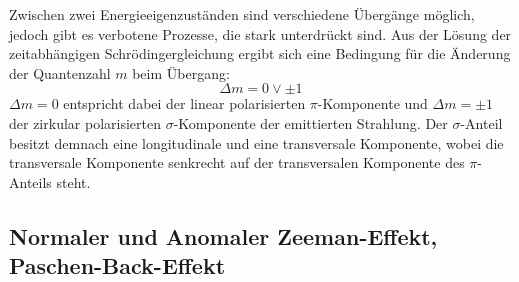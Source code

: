 Zwischen zwei Energieeigenzuständen sind verschiedene Übergänge möglich, jedoch gibt es verbotene Prozesse, die stark unterdrückt sind. Aus der Lösung der zeitabhängigen Schrödingergleichung ergibt sich eine Bedingung für die Änderung der Quantenzahl $m$ beim Übergang:
\begin{equation}
\Delta m = 0 \lor \pm 1 \label{eq:regeln}
\end{equation}
$\Delta m = 0$ entspricht dabei der linear polarisierten $\pi$-Komponente und $\Delta m = \pm 1$ der zirkular polarisierten $\sigma$-Komponente der emittierten Strahlung.
Der $\sigma$-Anteil besitzt demnach eine longitudinale und eine transversale Komponente, wobei die transversale Komponente senkrecht auf der transversalen Komponente des $\pi$-Anteils steht.

\subsection{Normaler und Anomaler Zeeman-Effekt, Paschen-Back-Effekt}

